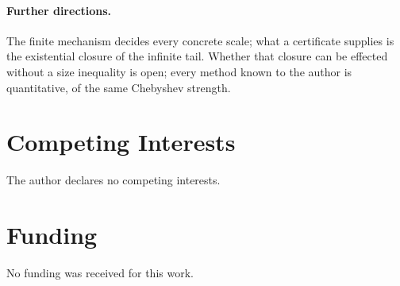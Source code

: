 \documentclass[11pt,a4paper]{amsart}
\theoremstyle{plain}
\theoremstyle{definition}
\theoremstyle{plain}
\theoremstyle{remark}
\begin{document}
\paragraph{Further directions.}
The finite mechanism decides every concrete scale; what a certificate supplies is the
existential closure of the infinite tail. Whether that closure can be effected without a
size inequality is open; every method known to the author is quantitative, of the same
Chebyshev strength.

\section*{Competing Interests}
The author declares no competing interests.

\section*{Funding}
No funding was received for this work.

\printbibliography
\end{document}
